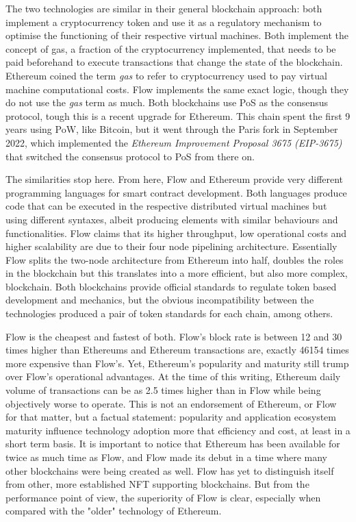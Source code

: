 \documentclass[../NFTComp_IEEE.tex]{subfiles}
\begin{document}
The two technologies are similar in their general blockchain approach: both implement a cryptocurrency token and use it as a regulatory mechanism to optimise the functioning of their respective virtual machines. Both implement the concept of gas, a fraction of the cryptocurrency implemented, that needs to be paid beforehand to execute transactions that change the state of the blockchain. Ethereum coined the term \textit{gas} to refer to cryptocurrency used to pay virtual machine computational costs. Flow implements the same exact logic, though they do not use the \textit{gas} term as much. Both blockchains use PoS as the consensus protocol, tough this is a recent upgrade for Ethereum. This chain spent the first 9 years using PoW, like Bitcoin, but it went through the Paris fork in September 2022, which implemented the \textit{Ethereum Improvement Proposal 3675 (EIP-3675)} \cite{EIP3675} that switched the consensus protocol to PoS from there on.
\par
The similarities stop here. From here, Flow and Ethereum provide very different programming languages for smart contract development. Both languages produce code that can be executed in the respective distributed virtual machines but using different syntaxes, albeit producing elements with similar behaviours and functionalities. Flow claims that its higher throughput, low operational costs and higher scalability are due to their four node pipelining architecture. Essentially Flow splits the two-node architecture from Ethereum into half, doubles the roles in the blockchain but this translates into a more efficient, but also more complex, blockchain. Both blockchains provide official standards to regulate token based development and mechanics, but the obvious incompatibility between the technologies produced a pair of token standards for each chain, among others.
\par
Flow is the cheapest and fastest of both. Flow's block rate is between 12 and 30 times higher than Ethereums and Ethereum transactions are, exactly 46154 times more expensive than Flow's. Yet, Ethereum's popularity and maturity still trump over Flow's operational advantages. At the time of this writing, Ethereum daily volume of transactions can be as 2.5 times higher than in Flow while being objectively worse to operate. This is not an endorsement of Ethereum, or Flow for that matter, but a factual statement: popularity and application ecosystem maturity influence technology adoption more that efficiency and cost, at least in a short term basis. It is important to notice that Ethereum has been available for twice as much time as Flow, and Flow made its debut in a time where many other blockchains were being created as well. Flow has yet to distinguish itself from other, more established NFT supporting blockchains. But from the performance point of view, the superiority of Flow is clear, especially when compared with the "older" technology of Ethereum.
\end{document}
